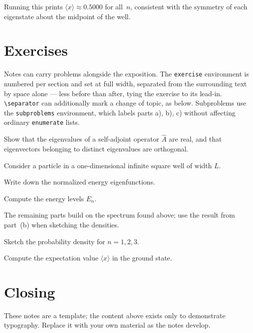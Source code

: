 \documentclass[a4paper,11pt]{article}
\begin{document}
Running this prints $\langle x \rangle \approx 0.5000$ for all~$n$, consistent with the symmetry of each eigenstate about the midpoint of the well.


\section{Exercises}

Notes can carry problems alongside the exposition. The
\verb|exercise| environment is numbered per section and set
at full width, separated from the surrounding text by space alone — less before than after, tying the exercise to its lead-in. \verb|\separator| can additionally mark a change of topic, as below. Subproblems use the \verb|subproblems| environment, which labels parts a), b), c) without affecting ordinary \verb|enumerate| lists.

\separator

\begin{exercise}
  Show that the eigenvalues of a self-adjoint operator $\hat{A}$ are real, and that eigenvectors belonging to distinct eigenvalues are orthogonal.
\end{exercise}

\begin{exercise}
  Consider a particle in a one-dimensional infinite square well of width $L$.
  \begin{subproblems}
    \item Write down the normalized energy eigenfunctions.
    \item Compute the energy levels $E_n$.
  \end{subproblems}

  The remaining parts build on the spectrum found above; use the result from part~(b) when sketching the densities.

  \begin{subproblems}[resume]
    \item Sketch the probability density for $n = 1, 2, 3$.
    \item Compute the expectation value $\langle x \rangle$ in the ground state.
  \end{subproblems}
\end{exercise}


\section{Closing}

These notes are a template; the content above exists only to demonstrate typography. Replace it with your own material as the notes develop.


\printbibliography
\end{document}
